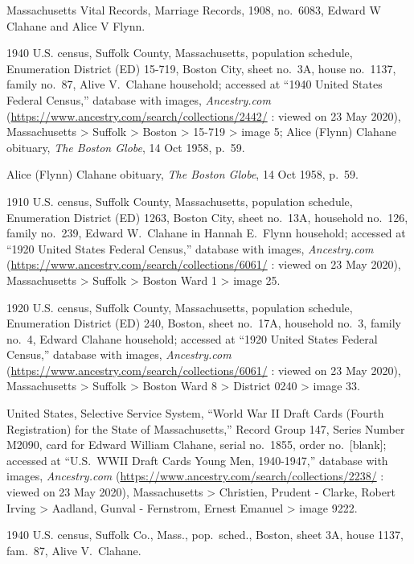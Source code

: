 \begin{thebibliography}{999}
Massachusetts Vital Records, Marriage Records, 1908, no.\ 6083, Edward W Clahane and Alice V Flynn.

1940 U.S. census, Suffolk County, Massachusetts, population schedule, Enumeration District (ED) 15-719, Boston City, sheet no.\ 3A, house no.\ 1137, family no.\ 87, Alive V.\ Clahane household; accessed at ``1940 United States Federal Census,'' database with images, \textit{Ancestry.com} (\url{https://www.ancestry.com/search/collections/2442/} : viewed on 23 May 2020), Massachusetts > Suffolk > Boston > 15-719 > image 5; Alice (Flynn) Clahane obituary, \textit{The Boston Globe}, 14 Oct 1958, p.\ 59.

Alice (Flynn) Clahane obituary, \textit{The Boston Globe}, 14 Oct 1958, p.\ 59.

1910 U.S. census, Suffolk County, Massachusetts, population schedule, Enumeration District (ED) 1263, Boston City, sheet no.\ 13A, household no.\ 126, family no.\ 239, Edward W.\ Clahane in Hannah E.\ Flynn household; accessed at ``1920 United States Federal Census,'' database with images, \textit{Ancestry.com} (\url{https://www.ancestry.com/search/collections/6061/} : viewed on 23 May 2020), Massachusetts > Suffolk > Boston Ward 1 > image 25.

1920 U.S. census, Suffolk County, Massachusetts, population schedule, Enumeration District (ED) 240, Boston, sheet no.\ 17A, household no.\ 3, family no.\ 4, Edward Clahane household; accessed at ``1920 United States Federal Census,'' database with images, \textit{Ancestry.com} (\url{https://www.ancestry.com/search/collections/6061/} : viewed on 23 May 2020), Massachusetts > Suffolk > Boston Ward 8 > District 0240 > image 33.

United States, Selective Service System, ``World War II Draft Cards (Fourth Registration) for the State of Massachusetts,'' Record Group 147, Series Number M2090, card for Edward William Clahane, serial no.\ 1855, order no.\ [blank]; accessed at ``U.S.\ WWII Draft Cards Young Men, 1940-1947,'' database with images, \textit{Ancestry.com} (\url{https://www.ancestry.com/search/collections/2238/} : viewed on 23 May 2020), Massachusetts > Christien, Prudent - Clarke, Robert Irving > Aadland, Gunval - Fernstrom, Ernest Emanuel > image 9222.

1940 U.S. census, Suffolk Co., Mass., pop.\ sched., Boston, sheet 3A, house 1137, fam.\ 87, Alive V.\ Clahane.


\end{thebibliography}
